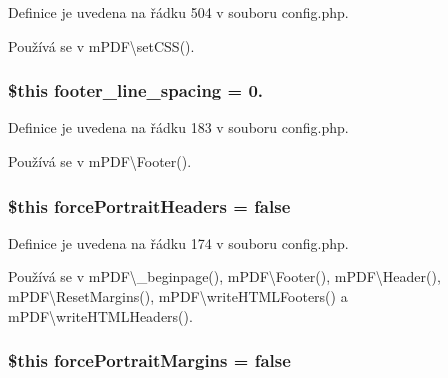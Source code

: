 Definice je uvedena na řádku 504 v souboru config.\-php.



Používá se v m\-P\-D\-F\textbackslash{}set\-C\-S\-S().

\hypertarget{config_8php_a7c42414bb054bea7d58089514c4d2043}{
\subsubsection[{footer\-\_\-line\-\_\-spacing}]{\setlength{\rightskip}{0pt plus 5cm}\$this footer\-\_\-line\-\_\-spacing = 0.}}\label{config_8php_a7c42414bb054bea7d58089514c4d2043}


Definice je uvedena na řádku 183 v souboru config.\-php.



Používá se v m\-P\-D\-F\textbackslash{}\-Footer().

\hypertarget{config_8php_aba0968aa1b8a40c171e109e1b36064a1}{
\subsubsection[{force\-Portrait\-Headers}]{\setlength{\rightskip}{0pt plus 5cm}\$this force\-Portrait\-Headers = {\bf false}}}\label{config_8php_aba0968aa1b8a40c171e109e1b36064a1}


Definice je uvedena na řádku 174 v souboru config.\-php.



Používá se v m\-P\-D\-F\textbackslash{}\-\_\-beginpage(), m\-P\-D\-F\textbackslash{}\-Footer(), m\-P\-D\-F\textbackslash{}\-Header(), m\-P\-D\-F\textbackslash{}\-Reset\-Margins(), m\-P\-D\-F\textbackslash{}write\-H\-T\-M\-L\-Footers() a m\-P\-D\-F\textbackslash{}write\-H\-T\-M\-L\-Headers().

\hypertarget{config_8php_a9546e70e45cfabe2c73bf7d917b56704}{
\subsubsection[{force\-Portrait\-Margins}]{\setlength{\rightskip}{0pt plus 5cm}\$this force\-Portrait\-Margins = {\bf false}}}\label{config_8php_a9546e70e45cfabe2c73bf7d917b56704}


